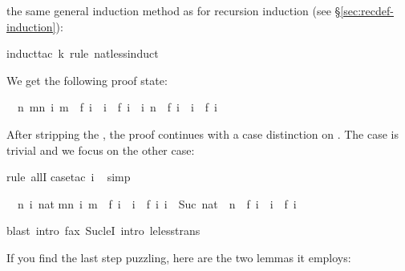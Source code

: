\begin{isabellebody}
\begin{isamarkuptxt}
the same general induction method as for recursion induction (see
\S\ref{sec:recdef-induction}):%
\end{isamarkuptxt}%
\isamarkuptrue%
\isamarkupfalse%
{\isacharparenleft}induct{\isacharunderscore}tac\ k\ rule{\isacharcolon}\ nat{\isacharunderscore}less{\isacharunderscore}induct{\isacharparenright}%
\begin{isamarkuptxt}%
\noindent
We get the following proof state:
\begin{isabelle}%
\ {}{\isachardot}\ {\isasymAnd}n{\isachardot}\ {\isasymforall}m{\isacharless}n{\isachardot}\ {\isasymforall}i{\isachardot}\ m\ {\isacharequal}\ f\ i\ {\isasymlongrightarrow}\ i\ {\isasymle}\ f\ i\ {\isasymLongrightarrow}\ {\isasymforall}i{\isachardot}\ n\ {\isacharequal}\ f\ i\ {\isasymlongrightarrow}\ i\ {\isasymle}\ f\ i%
\end{isabelle}
After stripping the , the proof continues with a case
distinction on . The case  is trivial and we focus on
the other case:%
\end{isamarkuptxt}%
\isamarkuptrue%
\isamarkupfalse%
{\isacharparenleft}rule\ allI{\isacharparenright}\isanewline
{}\isamarkupfalse%
{\isacharparenleft}case{\isacharunderscore}tac\ i{\isacharparenright}\isanewline
\ \isamarkupfalse%
{\isacharparenleft}simp{\isacharparenright}%
\begin{isamarkuptxt}%
\begin{isabelle}%
\ {}{\isachardot}\ {\isasymAnd}n\ i\ nat{\isachardot}\isanewline
{}m{\isacharless}n{\isachardot}\ {\isasymforall}i{\isachardot}\ m\ {\isacharequal}\ f\ i\ {\isasymlongrightarrow}\ i\ {\isasymle}\ f\ i{\isacharsemicolon}\ i\ {\isacharequal}\ Suc\ nat{\isasymrbrakk}\ {\isasymLongrightarrow}\ n\ {\isacharequal}\ f\ i\ {\isasymlongrightarrow}\ i\ {\isasymle}\ f\ i%
\end{isabelle}%
\end{isamarkuptxt}%
\isamarkuptrue%
\isamarkupfalse%
{\isacharparenleft}blast\ intro{\isacharbang}{\isacharcolon}\ f{\isacharunderscore}ax\ Suc{\isacharunderscore}leI\ intro{\isacharcolon}\ le{\isacharunderscore}less{\isacharunderscore}trans{\isacharparenright}%
\endisatagproof
{\isafoldproof}%
%
\isadelimproof
%
\endisadelimproof
%
\begin{isamarkuptext}%
\noindent
If you find the last step puzzling, here are the two lemmas it employs:

\end{isamarkuptext}
\end{isabellebody}
